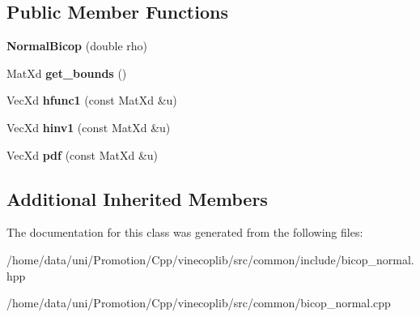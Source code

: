 \subsection*{Public Member Functions}
\begin{DoxyCompactItemize}
\item 
\hypertarget{class_normal_bicop_acc3c96fd89290fe74cc2b58a42564424}{{\bfseries Normal\+Bicop} (double rho)}\label{class_normal_bicop_acc3c96fd89290fe74cc2b58a42564424}

\item 
\hypertarget{class_normal_bicop_a2a4be0d6a8535f6a1d6eac382c89b52b}{Mat\+Xd {\bfseries get\+\_\+bounds} ()}\label{class_normal_bicop_a2a4be0d6a8535f6a1d6eac382c89b52b}

\item 
\hypertarget{class_normal_bicop_a7cb4259ed926e390e1702abd86c56abb}{Vec\+Xd {\bfseries hfunc1} (const Mat\+Xd \&u)}\label{class_normal_bicop_a7cb4259ed926e390e1702abd86c56abb}

\item 
\hypertarget{class_normal_bicop_a91b5ccb2b5d796d7d68f5ab932900403}{Vec\+Xd {\bfseries hinv1} (const Mat\+Xd \&u)}\label{class_normal_bicop_a91b5ccb2b5d796d7d68f5ab932900403}

\item 
\hypertarget{class_normal_bicop_a558c0af5dff67b781dcf4cb83222224b}{Vec\+Xd {\bfseries pdf} (const Mat\+Xd \&u)}\label{class_normal_bicop_a558c0af5dff67b781dcf4cb83222224b}

\end{DoxyCompactItemize}
\subsection*{Additional Inherited Members}


The documentation for this class was generated from the following files\+:\begin{DoxyCompactItemize}
\item 
/home/data/uni/\+Promotion/\+Cpp/vinecoplib/src/common/include/bicop\+\_\+normal.\+hpp\item 
/home/data/uni/\+Promotion/\+Cpp/vinecoplib/src/common/bicop\+\_\+normal.\+cpp\end{DoxyCompactItemize}
